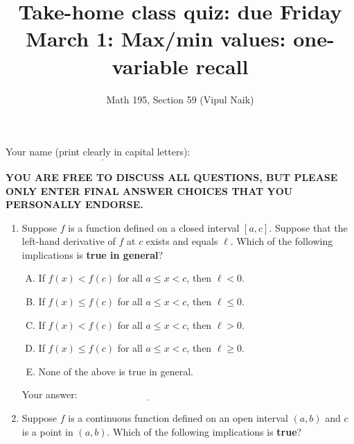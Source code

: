\documentclass[10pt]{amsart}
\title{Take-home class quiz: due Friday March 1: Max/min values: one-variable recall}
\author{Math 195, Section 59 (Vipul Naik)}
\begin{document}
\maketitle

Your name (print clearly in capital letters): $\underline{\qquad\qquad\qquad\qquad\qquad\qquad\qquad\qquad\qquad\qquad}$

{\bf YOU ARE FREE TO DISCUSS ALL QUESTIONS, BUT PLEASE ONLY ENTER FINAL ANSWER CHOICES THAT YOU PERSONALLY ENDORSE.}

\begin{enumerate}

\item Suppose $f$ is a function defined on a closed interval
  $[a,c]$. Suppose that the left-hand derivative of $f$ at $c$ exists
  and equals $\ell$. Which of the following implications is {\bf true
  in general}?

  \begin{enumerate}[(A)]
  \item If $f(x) < f(c)$ for all $a \le x < c$, then $\ell < 0$.
  \item If $f(x) \le f(c)$ for all $a \le x < c$, then $\ell \le 0$.
  \item If $f(x) < f(c)$ for all $a \le x < c$, then $\ell > 0$.
  \item If $f(x) \le f(c)$ for all $a \le x < c$, then $\ell \ge 0$.
  \item None of the above is true in general.
  \end{enumerate}

  \vspace{0.1in}
  Your answer: $\underline{\qquad\qquad\qquad\qquad\qquad\qquad\qquad}$
  \vspace{0.5in}

\item Suppose $f$ is a continuous function defined on an open interval
  $(a,b)$ and $c$ is a point in $(a,b)$. Which of the following
  implications is {\bf true}?
  \begin{enumerate}[(A)]


\end{enumerate}
\end{enumerate}
\end{document}
